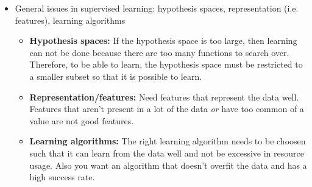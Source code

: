 \documentclass{article}
\begin{document}
\begin{itemize}
\begin{itemize}
	\end{itemize}
\item General issues in supervised learning: hypothesis spaces, representation (i.e. features), learning algorithms
	\begin{itemize}
	\item {\bf Hypothesis spaces:} If the hypothesis space is too large, then learning can not be done because there are too many functions to search over. Therefore, to be able to learn, the hypothesis space must be restricted to a smaller subset so that it is possible to learn.
	\item {\bf Representation/features:} Need features that represent the data well. Features that aren't present in a lot of the data {\em or} have too common of a value are not good features.
	\item {\bf Learning algorithms:} The right learning algorithm needs to be choosen such that it can learn from the data well and not be excessive in resource usage. Also you want an algorithm that doesn't overfit the data and has a high success rate.
	\end{itemize}
\end{itemize}
\end{document}
